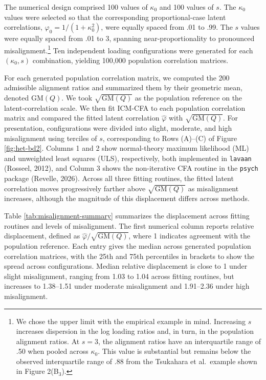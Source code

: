 \documentclass[
  american,
  man,floatsintext]{apa7}
\begin{document}
The numerical design comprised 100 values of \(\kappa_0\) and 100 values of \(s\). The \(\kappa_0\) values were selected so that the corresponding proportional-case latent correlations, \(\varphi_0=1/(1+\kappa_0^2)\), were equally spaced from .01 to .99. The \(s\) values were equally spaced from .01 to 3, spanning near-proportionality to pronounced misalignment.\footnote{We chose the upper limit with the empirical example in mind. Increasing \(s\) increases dispersion in the log loading ratios and, in turn, in the population alignment ratios. At \(s=3\), the alignment ratios have an interquartile range of .50 when pooled across \(\kappa_0\). This value is substantial but remains below the observed interquartile range of .88 from the Tsukahara et al.~example shown in Figure 2(B\(_3\)).} Ten independent loading configurations were generated for each \((\kappa_0,s)\) combination, yielding 100,000 population correlation matrices.

For each generated population correlation matrix, we computed the 200 admissible alignment ratios and summarized them by their geometric mean, denoted \(\mathrm{GM}(Q)\). We took \(\sqrt{\mathrm{GM}(Q)}\) as the population reference on the latent-correlation scale. We then fit ICM-CFA to each population correlation matrix and compared the fitted latent correlation \(\widehat{\varphi}\) with \(\sqrt{\mathrm{GM}(Q)}\). For presentation, configurations were divided into slight, moderate, and high misalignment using terciles of \(s\), corresponding to Rows (A)--(C) of Figure \ref{fig:het-bd2}. Columns 1 and 2 show normal-theory maximum likelihood (ML) and unweighted least squares (ULS), respectively, both implemented in \texttt{lavaan} (Rosseel, 2012), and Column 3 shows the non-iterative CFA routine in the \texttt{psych} package (Revelle, 2026). Across all three fitting routines, the fitted latent correlation moves progressively farther above \(\sqrt{\mathrm{GM}(Q)}\) as misalignment increases, although the magnitude of this displacement differs across methods.

Table \ref{tab:misalignment-summary} summarizes the displacement across fitting routines and levels of misalignment. The first numerical column reports relative displacement, defined as \(\widehat{\varphi}/\sqrt{\mathrm{GM}(Q)}\), where 1 indicates agreement with the population reference. Each entry gives the median across generated population correlation matrices, with the 25th and 75th percentiles in brackets to show the spread across configurations. Median relative displacement is close to 1 under slight misalignment, ranging from 1.03 to 1.04 across fitting routines, but increases to 1.38--1.51 under moderate misalignment and 1.91--2.36 under high misalignment.
\end{document}
